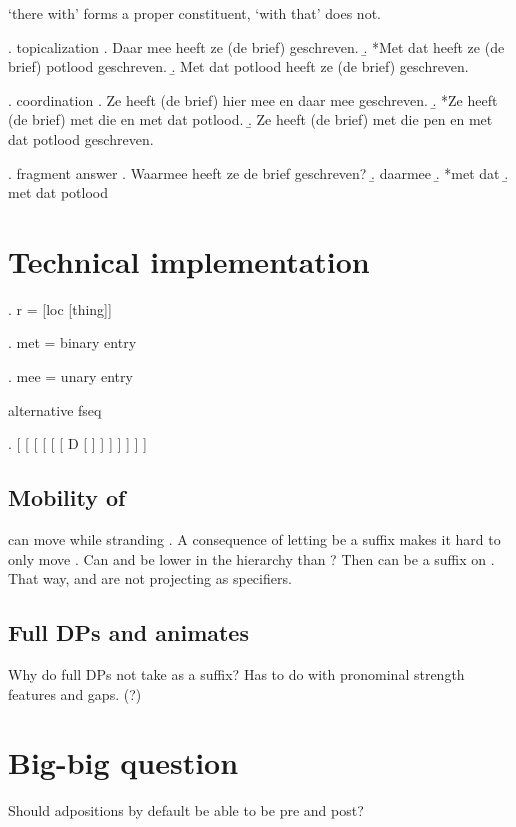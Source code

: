 \documentclass[12pt]{article}
\begin{document}
 `there with' forms a proper constituent,  `with that' does not.

\ex. topicalization
\a. Daar mee heeft ze (de brief) geschreven.
\b. *Met dat heeft ze (de brief) potlood geschreven.
\b. Met dat potlood heeft ze (de brief) geschreven.

\ex. coordination
\a. Ze heeft (de brief) hier mee en daar mee geschreven.
\b. *Ze heeft (de brief) met die en met dat potlood.
\b. Ze heeft (de brief) met die pen en met dat potlood geschreven.

\ex. fragment answer
\a. Waarmee heeft ze de brief geschreven?
\b. daarmee
\b. *met dat
\b. met dat potlood


\section{Technical implementation}

\ex. r = [loc [thing]]

\ex. met = binary entry

\ex. mee = unary entry


alternative fseq

\ex. [ [ [ [ [ [ D [  ] ] ] ] ] ] ]


\subsection{Mobility of }

 can move while stranding . A consequence of letting  be a suffix makes it hard to only move . Can  and  be lower in the hierarchy than ? Then  can be a suffix on . That way,  and  are not projecting as specifiers.

\subsection{Full DPs and animates}

Why do full DPs not take  as a suffix? Has to do with pronominal strength features and gaps. (?)


\section{Big-big question}

Should adpositions by default be able to be pre and post?
\end{document}
